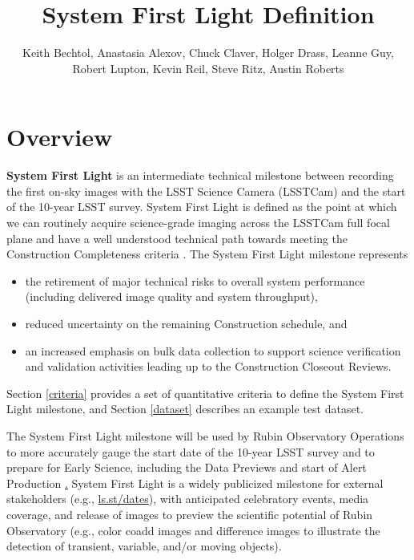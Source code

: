 \documentclass[SE,authoryear,toc]{lsstdoc}
\title{System First Light Definition}
\author{%
Keith Bechtol, Anastasia Alexov, Chuck Claver, Holger Drass, Leanne Guy, Robert Lupton, Kevin Reil, Steve Ritz, Austin Roberts
}
\date{\vcsDate}
\begin{document}
\maketitle


\section{Overview}
\label{overview}

\textbf{System First Light} is an intermediate technical milestone between recording the first on-sky images with the LSST Science Camera (LSSTCam) and the start of the 10-year LSST survey.
System First Light is defined as the point at which we can routinely acquire science-grade imaging across the LSSTCam full focal plane and have a well understood technical path towards meeting the Construction Completeness criteria .
The System First Light milestone represents

\begin{itemize}
  \item the retirement of major technical risks to overall system performance (including delivered image quality and system throughput),
  \item reduced uncertainty on the remaining Construction schedule, and
  \item an increased emphasis on bulk data collection to support science verification and validation activities leading up to the Construction Closeout Reviews.
\end{itemize}

Section \ref{criteria} provides a set of quantitative criteria to define the System First Light milestone, and Section \ref{dataset} describes an example test dataset.

The System First Light milestone will be used by Rubin Observatory Operations to more accurately gauge the start date of the 10-year LSST survey and to prepare for Early Science, including the Data Previews and start of Alert Production  \href{https://rtn-011.lsst.io/}.
System First Light is a widely publicized milestone for external stakeholders (e.g., \href{https://ls.st/dates}{ls.st/dates}), with anticipated celebratory events, media coverage, and release of images to preview the scientific potential of Rubin Observatory (e.g., color coadd images and difference images to illustrate the detection of transient, variable, and/or moving objects).
\end{document}

